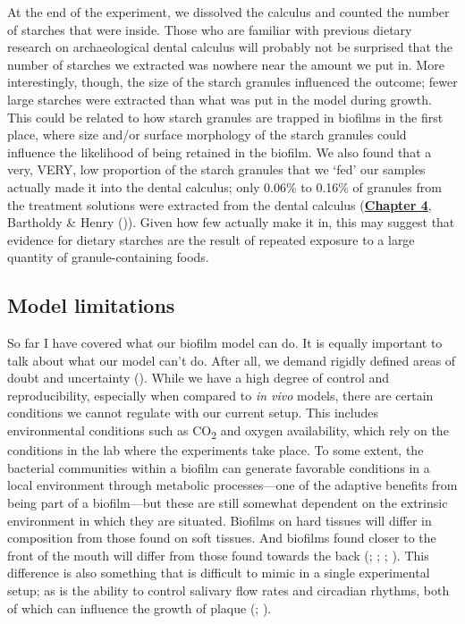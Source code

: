 \documentclass[
  b5paper,
]{book}
\begin{document}
At the end of the experiment, we dissolved the calculus and counted the
number of starches that were inside. Those who are familiar with
previous dietary research on archaeological dental calculus will
probably not be surprised that the number of starches we extracted was
nowhere near the amount we put in. More interestingly, though, the size
of the starch granules influenced the outcome; fewer large starches were
extracted than what was put in the model during growth. This could be
related to how starch granules are trapped in biofilms in the first
place, where size and/or surface morphology of the starch granules could
influence the likelihood of being retained in the biofilm. We also found
that a very, VERY, low proportion of the starch granules that we `fed'
our samples actually made it into the dental calculus; only 0.06\% to
0.16\% of granules from the treatment solutions were extracted from the
dental calculus (\hyperref[byoc-starch]{\textbf{Chapter 4}}, Bartholdy
\& Henry ()). Given
how few actually make it in, this may suggest that evidence for dietary
starches are the result of repeated exposure to a large quantity of
granule-containing foods.

\subsection{Model limitations}\label{disc-model-limitations}

So far I have covered what our biofilm model can do. It is equally
important to talk about what our model can't do. After all, we demand
rigidly defined areas of doubt and uncertainty
(). While we have
a high degree of control and reproducibility, especially when compared
to \emph{in vivo} models, there are certain conditions we cannot
regulate with our current setup. This includes environmental conditions
such as CO\textsubscript{2} and oxygen availability, which rely on the
conditions in the lab where the experiments take place. To some extent,
the bacterial communities within a biofilm can generate favorable
conditions in a local environment through metabolic processes---one of
the adaptive benefits from being part of a biofilm---but these are still
somewhat dependent on the extrinsic environment in which they are
situated. Biofilms on hard tissues will differ in composition from those
found on soft tissues. And biofilms found closer to the front of the
mouth will differ from those found towards the back
(; ;
;
). This
difference is also something that is difficult to mimic in a single
experimental setup; as is the ability to control salivary flow rates and
circadian rhythms, both of which can influence the growth of plaque
(;
).
\end{document}
